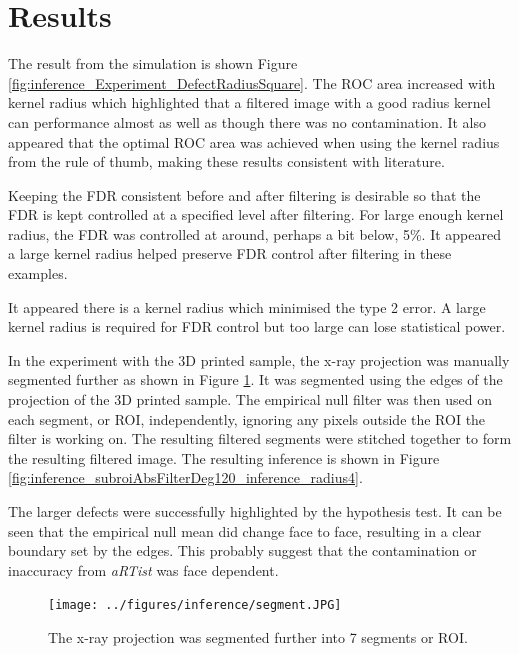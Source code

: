\documentclass{proc}
\begin{document}
\section{Results}

The result from the simulation is shown Figure \ref{fig:inference_Experiment_DefectRadiusSquare}. The ROC area increased with kernel radius which highlighted that a filtered image with a good radius kernel can performance almost as well as though there was no contamination. It also appeared that the optimal ROC area was achieved when using the kernel radius from the rule of thumb, making these results consistent with literature.

Keeping the FDR consistent before and after filtering is desirable so that the FDR is kept controlled at a specified level after filtering. For large enough kernel radius, the FDR was controlled at around, perhaps a bit below, 5\%. It appeared a large kernel radius helped preserve FDR control after filtering in these examples. 

It appeared there is a kernel radius which minimised the type 2 error. A large kernel radius is required for FDR control but too large can lose statistical power.

In the experiment with the 3D printed sample, the x-ray projection was manually segmented further as shown in Figure \ref{fig:inference_segmentFurther}. It was segmented using the edges of the projection of the 3D printed sample. The empirical null filter was then used on each segment, or ROI, independently, ignoring any pixels outside the ROI the filter is working on. The resulting filtered segments were stitched together to form the resulting filtered image. The resulting inference is shown in Figure \ref{fig:inference_subroiAbsFilterDeg120_inference_radius4}.

The larger defects were successfully highlighted by the hypothesis test. It can be seen that the empirical null mean did change face to face, resulting in a clear boundary set by the edges. This probably suggest that the contamination or inaccuracy from \emph{aRTist} was face dependent.

\begin{figure}
  \centering
  \texttt{[image: ../figures/inference/segment.JPG]}
  \caption{The x-ray projection was segmented further into 7 segments or ROI.}
  \label{fig:inference_segmentFurther}
\end{figure}
\end{document}
